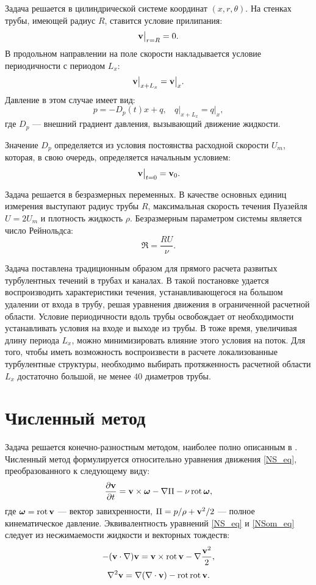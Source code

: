Задача решается в цилиндрической системе координат $(x,r,\theta)$. На стенках трубы, имеющей радиус $R$, ставится условие прилипания:
\begin{equation} \label{bc1_eq}
\mathbf{v} \big|_{r=R} = 0.
\end{equation}
В продольном направлении на поле скорости накладывается условие периодичности с периодом $L_x$:
\begin{equation} \label{bc2_eq}
\mathbf{v} \big|_{x+L_x} = \mathbf{v} \big|_{x}.
\end{equation}
Давление в этом случае имеет вид:
$$
p = - D_p(t)x + q, \ \ \ \  q\big|_{x+L_x} = q\big|_{x},
$$
где $D_p$ --- внешний градиент давления, вызывающий движение жидкости. 

Значение $D_p$ определяется из условия постоянства расходной скорости $U_m$, которая, в свою очередь, определяется начальным условием:
$$
\mathbf{v}\big|_{t=0} = \mathbf{v}_0.
$$

 
Задача решается в безразмерных переменных. В качестве основных единиц измерения выступают радиус трубы $R$, максимальная скорость течения Пуазейля $U = 2U_m$ и плотность жидкость $\rho$. Безразмерным параметром системы является число Рейнольдса:
$$
\Re = \frac{R U}{\nu}. 
$$

Задача поставлена традиционным образом для прямого расчета развитых турбулентных течений в трубах и каналах. В такой постановке удается воспроизводить характеристики течения, устанавливающегося на большом удалении от входа в трубу, решая уравнения движения в ограниченной расчетной области. Условие периодичности вдоль трубы освобождает от необходимости устанавливать условия на входе и выходе из трубы. В тоже время, увеличивая длину периода $L_x$, можно минимизировать влияние этого условия на поток. Для того, чтобы иметь возможность воспроизвести в расчете локализованные турбулентные структуры, необходимо выбирать протяженность расчетной области $L_x$ достаточно большой, не менее $40$ диаметров трубы. 

\section{Численный метод} \label{num_method}

Задача решается конечно-разностным методом, наиболее полно описанным в \cite{Nikitin2006}. Численный метод формулируется относительно уравнения движения \eqref{NS_eq}, преобразованного к следующему виду:
\begin{equation}\label{NSom_eq}
\frac{\partial \mathbf{v}}{\partial t} =  \mathbf{v} \times \mbox{\boldmath$\omega$}  - \nabla \Pi - \nu \mathop{}\!\operatorname{rot} \mbox{\boldmath$\omega$},
\end{equation}
где $\mbox{\boldmath$\omega$} = \mathop{}\!\operatorname{rot} \mathbf{v}$ --- вектор завихренности, $\Pi = p/\rho + \mathbf{v}^2/2$ --- полное кинематическое давление. Эквивалентность уравнений \eqref{NS_eq} и \eqref{NSom_eq} следует из несжимаемости жидкости и векторных тождеств:
\begin{equation*}
-(\mathbf{v} \cdot \nabla) \mathbf{v} = \mathbf{v} \times \mathop{}\!\operatorname{rot} \mathbf{v} - \nabla \frac{\mathbf{v}^2}{2},
\end{equation*}
\begin{equation*}
\nabla^2 \mathbf{v} = \nabla (\nabla \cdot \mathbf{v}) - \mathop{}\!\operatorname{rot} \mathop{}\!\operatorname{rot} \mathbf{v}.
\end{equation*}

